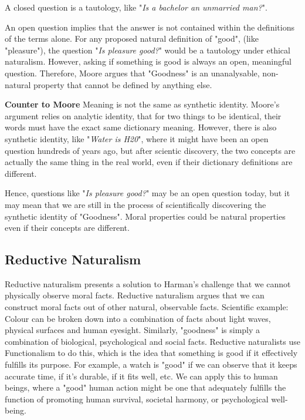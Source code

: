 \documentclass[12pt]{article}
\begin{document}
\noindent A closed question is a tautology, like "\textit{Is a bachelor an unmarried man?}".

\noindent An open question implies that the answer is not contained within the definitions of the terms alone.
For any proposed natural definition of "good", (like "pleasure"), the question
"\textit{Is pleasure good?}" would be a tautology under ethical naturalism.
However, asking if something is good is always an open, meaningful question.
Therefore, Moore argues that "Goodness" is an unanalysable, non-natural property that cannot be defined by anything else. 

\noindent\textbf{Counter to Moore} Meaning is not the same as synthetic identity.
Moore's argument relies on analytic identity, that for two things to be identical,
their words must have the exact same dictionary meaning.
However, there is also synthetic identity, like "\textit{Water is H20}", 
where it might have been an open question hundreds of years ago, but after scientic discovery, the two concepts are actually the same thing in the real world,
even if their dictionary definitions are different.

\noindent Hence, questions like "\textit{Is pleasure good?}" may be an open question today,
but it may mean that we are still in the process of scientifically discovering the synthetic identity of "Goodness". Moral properties could be natural properties even if their concepts are different.

\subsection{Reductive Naturalism}
Reductive naturalism presents a solution to Harman's challenge that we cannot physically observe moral facts.
Reductive naturalism argues that we can construct moral facts out of other natural, observable facts.
Scientific example: Colour can be broken down into a combination of facts about light waves, physical surfaces and human eyesight.
Similarly, "goodness" is simply a combination of biological, psychological and social facts.
Reductive naturalists use Functionalism to do this, which is the idea that something is good if it effectively fulfills its purpose.
For example, a watch is "good" if we can observe that it keeps accurate time, if it's durable, if it fits well, etc.
We can apply this to human beings, where a "good" human action might be one that adequately fulfills the function of promoting human survival,
societal harmony, or psychological well-being. 
\end{document}
